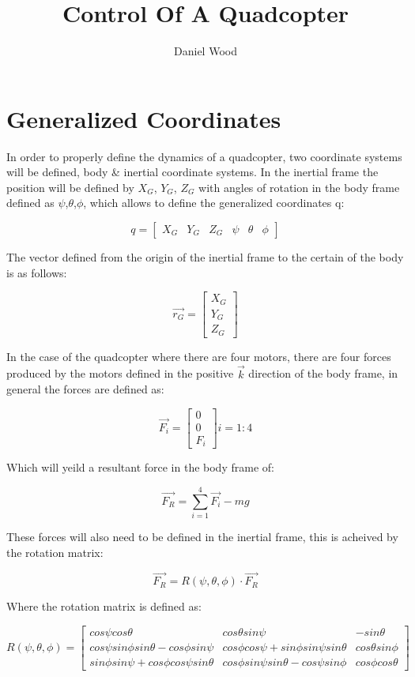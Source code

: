 \documentclass[10pt, letterpaper]{article}
\begin{document}
\title{Control Of A Quadcopter}
\author{Daniel Wood}
\maketitle

\section{Generalized Coordinates}
In order to properly define the dynamics of a quadcopter, two coordinate systems will be defined, body \& inertial coordinate systems. In the inertial frame the position will be defined by $X_{G}$, $Y_{G}$, $Z_{G}$ with angles of rotation in the body frame defined as $\psi$,$\theta$,$\phi$, which allows to define the generalized coordinates q:

\[
q=[\begin{array}{cccccc}
X_{G} & Y_{G} & Z_{G} & \psi & \theta & \phi\end{array}]
\]

The vector defined from the origin of the inertial
frame to the certain of the body is as follows:

\[
\overrightarrow{r_{G}}= \left[\begin{array}{c}
X_{G}\\
Y_{G}\\
Z_{G}
\end{array}\right]
\]

In the case of the quadcopter where there are four motors, there are
four forces produced by the motors defined in the positive $\overrightarrow{k}$ direction
of the body frame, in general the forces are defined as:

\[
\overrightarrow{F_{i}}=\left[\begin{array}{c}
0\\
0\\
F_{i}
\end{array}\right]i=1:4
\]

Which will yeild a resultant force in the body frame of:

\[
\overrightarrow{F_{R}}=\sum_{i=1}^{4}\overrightarrow{F_{i}}-mg
\]

These forces will also need to be defined in the inertial frame, this
is acheived by the rotation matrix:

\[
\overrightarrow{F_{R}}=R(\psi,\theta,\phi)\cdot \overrightarrow{F_{R}}
\]

Where the rotation matrix is defined as:

\[
R(\psi,\theta,\phi)=\left[\begin{array}{ccc}
cos\psi cos\theta & cos\theta sin\psi & -sin\theta\\
cos\psi sin\phi sin\theta-cos\phi sin\psi & cos\phi cos\psi+sin\phi sin\psi sin\theta & cos\theta sin\phi\\
sin\phi sin\psi+cos\phi cos\psi sin\theta & cos\phi sin\psi sin\theta-cos\psi sin\phi & cos\phi cos\theta
\end{array}\right]
\]
\end{document}

